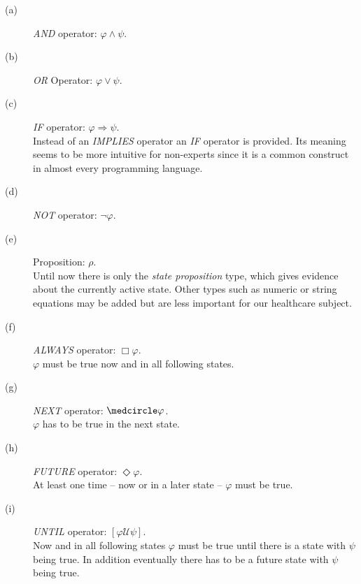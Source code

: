 \documentclass[conference]{IEEEtran}
\begin{document}
\begin{description}
	\item[(a)] \emph{AND} operator: $\varphi \wedge \psi$.
	\item[(b)] \emph{OR} Operator: $\varphi \vee \psi$.
	\item[(c)] \emph{IF} operator: $\varphi \Rightarrow \psi$.\\Instead of an \emph{IMPLIES} operator an \emph{IF} operator is provided. Its meaning seems to be more intuitive for non-experts since it is a common construct in almost every programming language.
	\item[(d)] \emph{NOT} operator: $\neg \varphi$.
	\item[(e)] Proposition: $\rho$.\\Until now there is only the \emph{state proposition} type, which gives evidence about the currently active state. Other types such as numeric or string equations may be added but are less important for our healthcare subject.
	\item[(f)] \emph{ALWAYS} operator: $\Box \varphi$.\\$\varphi$ must be true now and in all following states.
	\item[(g)] \emph{NEXT} operator: $\medcircle \varphi$.\\$\varphi$ has to be true in the next state.
	\item[(h)] \emph{FUTURE} operator: $\Diamond \varphi$.\\At least one time -- now or in a later state -- $\varphi$ must be true.
	\item[(i)] \emph{UNTIL} operator: $[\varphi \mathcal{U} \psi]$.\\Now and in all following states $\varphi$ must be true until there is a state with $\psi$ being true. In addition eventually there has to be a future state with $\psi$ being true.
\end{description}
\end{document}

